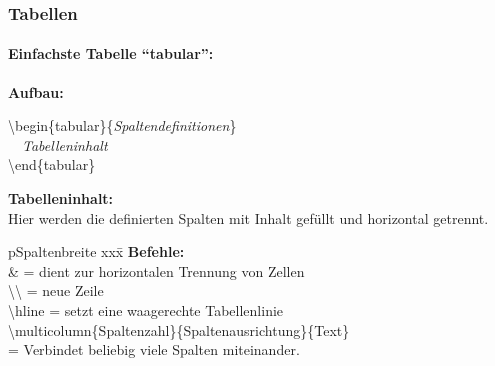 
\begin{frame}
\frametitle{Tabellen}
\framesubtitle{Einfachste Tabelle "`tabular"':}
\medskip
\textbf{Aufbau:}\\
\begin{ttfamily}
\color{unibablueI}\textbackslash begin\color{black}\{tabular\}\{\textit{Spaltendefinitionen}\}\\
~~\textit{Tabelleninhalt}\\
\color{unibablueI}\textbackslash end\color{black}\{tabular\}\\
\end{ttfamily}
\medskip
\textbf{Tabelleninhalt:}\\
Hier werden die definierten Spalten mit Inhalt gefüllt und horizontal getrennt.
\begin{tabbing}[H]p{Spaltenbreite}
xxx\=\kill
\textbf{Befehle:}\\
\color{nounibaredI}\&\color{black} \>= dient zur horizontalen Trennung von Zellen\\
\color{nounibaredI}\textbackslash \textbackslash \color{black} \>=  neue Zeile\\
\color{nounibaredI}\textbackslash hline\color{black} \>= setzt eine waagerechte Tabellenlinie\\[2mm]
\color{nounibaredI}\textbackslash multicolumn\color{black}\{Spaltenzahl\}\{Spaltenausrichtung\}\{Text\}\\[2mm]
\>= Verbindet beliebig viele Spalten miteinander.\\
\end{tabbing}
\end{frame}




